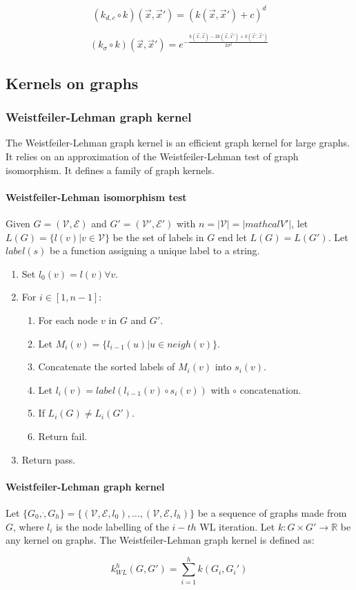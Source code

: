 		$$(k_{d,c}\circ k)(\vec{x},\vec{x}') = (k(\vec{x},\vec{x}')+c)^d$$

		$$(k_\sigma\circ k)(\vec{x},\vec{x}') = e^{-\frac{k(\vec{x},\vec{x})-2k(\vec{x},\vec{x}')+k(\vec{x}',\vec{x}')}{2\sigma^2}}$$

	\subsection{Kernels on graphs}

		\subsubsection{Weistfeiler-Lehman graph kernel}
		The Weistfeiler-Lehman graph kernel is an efficient graph kernel for large graphs.
		It relies on an approximation of the Weistfeiler-Lehman test of graph isomorphism.
		It defines a family of graph kernels.

			\paragraph{Weistfeiler-Lehman isomorphism test}
			Given $G=(\mathcal{V},\mathcal{E})$ and $G'=(\mathcal{V}',\mathcal{E}')$ with $n=|\mathcal{V}|=|mathcal{V}'|$, let $L(G) = \{l(v)|v\in\mathcal{V}\}$ be the set of labels in $G$ end let $L(G) =L(G')$.
			Let $label(s)$ be a function assigning a unique label to a string.

			\begin{enumerate}
				\item Set $l_0(v) = l(v)\forall v$.
				\item For $i\in[1,n-1]$:
					\begin{enumerate}
						\item For each node $v$ in $G$ and $G'$.
						\item Let $M_i(v) = \{l_{i-1}(u)|u\in neigh(v)\}$.
						\item Concatenate the sorted labels of $M_i(v)$ into $s_i(v)$.
						\item Let $l_i(v) = label(l_{i-1}(v)\circ s_i(v))$ with $\circ$ concatenation.
						\item If $L_i(G)\neq L_i(G')$.
						\item Return fail.
					\end{enumerate}
				\item Return pass.
			\end{enumerate}

			\paragraph{Weistfeiler-Lehman graph kernel}
			Let $\{G_0,\dot,G_h\} = \{(\mathcal{V},\mathcal{E},l_0),\dots, (\mathcal{V},\mathcal{E},l_h)\}$ be a sequence of graphs made from $G$, where $l_i$ is the node labelling of the $i-th$ WL iteration.
			Let $k:G\times G'\rightarrow\mathbb{R}$ be any kernel on graphs.
			The Weistfeiler-Lehman graph kernel is defined as:

			$$k_{WL}^h(G,G') = \sum\limits_{i=1}^hk(G_i,G_i')$$

